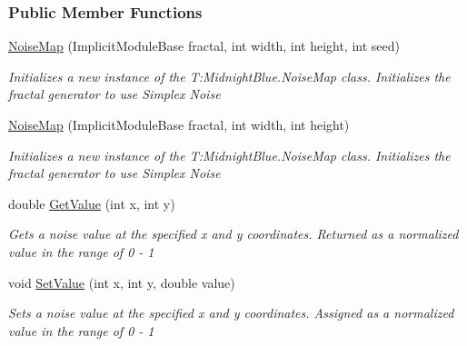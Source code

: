 \subsubsection*{Public Member Functions}
\begin{DoxyCompactItemize}
\item 
\hyperlink{class_midnight_blue_1_1_noise_map_af9e93d0f595baf7f0e7c371cbbaa1809}{Noise\+Map} (Implicit\+Module\+Base fractal, int width, int height, int seed)
\begin{DoxyCompactList}\small\item\em Initializes a new instance of the T\+:\+Midnight\+Blue.\+Noise\+Map class. Initializes the fractal generator to use Simplex Noise \end{DoxyCompactList}\item 
\hyperlink{class_midnight_blue_1_1_noise_map_ad4c66d8f106a0b2c7018a5875e470e14}{Noise\+Map} (Implicit\+Module\+Base fractal, int width, int height)
\begin{DoxyCompactList}\small\item\em Initializes a new instance of the T\+:\+Midnight\+Blue.\+Noise\+Map class. Initializes the fractal generator to use Simplex Noise \end{DoxyCompactList}\item 
double \hyperlink{class_midnight_blue_1_1_noise_map_a70d9e8d99e157143eb3d1dbc3895cb9a}{Get\+Value} (int x, int y)
\begin{DoxyCompactList}\small\item\em Gets a noise value at the specified x and y coordinates. Returned as a normalized value in the range of 0 -\/ 1 \end{DoxyCompactList}\item 
void \hyperlink{class_midnight_blue_1_1_noise_map_a26d94cbea4c0377833bed064cbd36496}{Set\+Value} (int x, int y, double value)
\begin{DoxyCompactList}\small\item\em Sets a noise value at the specified x and y coordinates. Assigned as a normalized value in the range of 0 -\/ 1 \end{DoxyCompactList}\end{DoxyCompactItemize}
